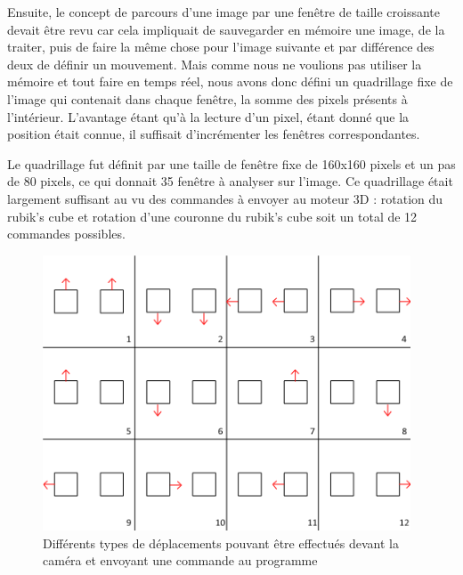 \documentclass[10pt,a4paper]{report}
\begin{document}
Ensuite, le concept de parcours d'une image par une fenêtre de taille croissante devait être revu car cela impliquait de sauvegarder en mémoire une image, de la traiter, puis de faire la même chose pour l'image suivante et par différence des deux de définir un mouvement. Mais comme nous ne voulions pas utiliser la mémoire et tout faire en temps réel, nous avons donc défini un quadrillage fixe de l'image qui contenait dans chaque fenêtre, la somme des pixels présents à l'intérieur. L'avantage étant qu'à la lecture d'un pixel, étant donné que la position était connue, il suffisait d'incrémenter les fenêtres correspondantes.

Le quadrillage fut définit par une taille de fenêtre fixe de 160x160 pixels et un pas de 80 pixels, ce qui donnait 35 fenêtre à analyser sur l'image. Ce quadrillage était largement suffisant au vu des commandes à envoyer au moteur 3D : rotation du rubik's cube et rotation d'une couronne du rubik's cube soit un total de 12 commandes possibles.

\begin{figure}[!h]
\centering
\includegraphics[width=310pt]{gfx/schema_motion_sensing.png}
\caption{Différents types de déplacements pouvant être effectués devant la caméra et envoyant une commande au programme}
\end{figure}
\end{document}
